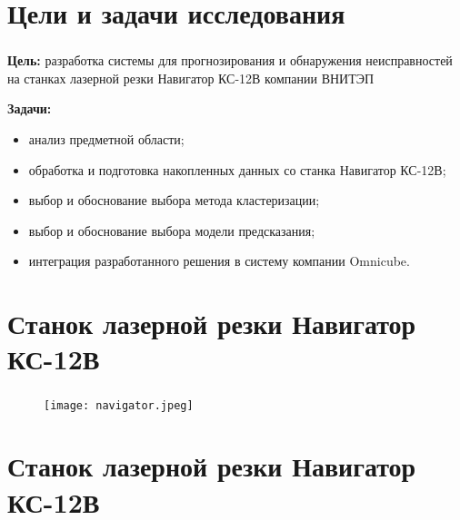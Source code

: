 
\frame[plain]{\titlepage} %


\section{Цели и задачи исследования}

\begin{frame}
\frametitle{\insertsection}

\textbf{Цель:} разработка системы для прогнозирования и обнаружения неисправностей
на станках лазерной резки Навигатор КС-12В компании ВНИТЭП

\vspace{\baselineskip}

\textbf{Задачи:}
\begin{itemize}
    \item анализ предметной области;
    \item обработка и подготовка накопленных данных со станка Навигатор КС-12В;
    \item выбор и обоснование выбора метода кластеризации;
    \item выбор и обоснование выбора модели предсказания;
    \item интеграция разработанного решения в систему компании Omnicube.
\end{itemize}
\end{frame}


\section{Станок лазерной резки Навигатор КС-12В}

\begin{frame}
\frametitle{\insertsection}

\begin{figure}
    \center
    \texttt{[image: navigator.jpeg]}
\end{figure}

\end{frame}


\section{Станок лазерной резки Навигатор КС-12В}

